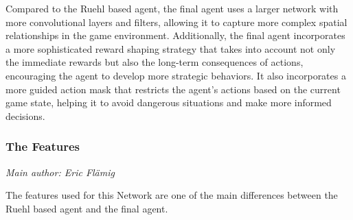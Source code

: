 \documentclass[11pt,a4paper]{article}
\newcommand{\contributionauthor}[1]{{\small\textit{Main author: #1}\par}}
\begin{document}
Compared to the Ruehl based agent, the final agent uses a larger network with more convolutional layers and filters, allowing it to capture more complex spatial relationships in the game environment. Additionally, the final agent incorporates a more sophisticated reward shaping strategy that takes into account not only the immediate rewards but also the long-term consequences of actions, encouraging the agent to develop more strategic behaviors. It also incorporates a more guided action mask that restricts the agent's actions based on the current game state, helping it to avoid dangerous situations and make more informed decisions.
\subsubsection{The Features}
\contributionauthor{Eric Flämig}
The features used for this Network are one of the main differences between the Ruehl based agent and the final agent.
\end{document}
